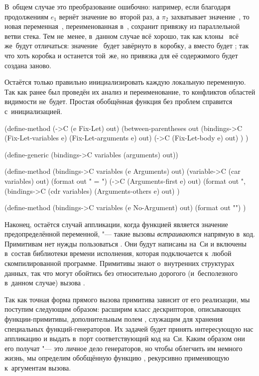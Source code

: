 В~общем случае это преобразование ошибочно: например, если благодаря
продолжениям $e_1$ вернёт значение во~второй раз, а $\pi_2$ захватывает
значение~, то новая переменная~, переименованная в~, сохранит
привязку  из параллельной ветви стека.
 Тем не~менее, в~данном случае
всё хорошо, так как клоны~ всё же~будут отличаться: значение~
будет завёрнуто в~коробку, а вместо  будет ; так что хоть
коробка и останется той~же, но привязка для её содержимого будет создана заново.

Остаётся только правильно инициализировать каждую локальную переменную. Так как
ранее был проведён их анализ и переименование, то конфликтов областей видимости
не~будет. Простая обобщённая функция  без проблем справится
с~инициализацией.

\begin{code:lisp}
(define-method (->C (e Fix-Let) out)
  (between-parentheses out
    (bindings->C (Fix-Let-variables e) (Fix-Let-arguments e) out)
    (->C (Fix-Let-body e) out) ) )

(define-generic (bindings->C variables (arguments) out))

(define-method (bindings->C variables (e Arguments) out)
  (variable->C (car variables) out)
  (format out " = ")
  (->C (Arguments-first e) out)
  (format out ",~%
  (bindings->C (cdr variables) (Arguments-others e) out) )

(define-method (bindings->C variables (e No-Argument) out)
  (format out "") )
\end{code:lisp}

Наконец, остаётся случай аппликации, когда функцией является значение
предопределённой переменной, "--- такие вызовы \emph{встраиваются} напрямую
в~код. Примитивам нет нужды пользоваться . Они будут написаны
на~Си и включены в~состав библиотеки времени исполнения, которая подключается
к~любой скомпилированной программе. Примитивы знают о~внутренних структурах
данных, так что могут обойтись без относительно дорогого (и~бесполезного
в~данном случае) вызова .

Так как точная форма прямого вызова примитива зависит от его реализации, мы
поступим следующим образом: расширим класс дескрипторов, описывающих
функции-примитивы, дополнительным полем , служащим для хранения
специальных функций-генераторов. Их задачей будет принять интересующую нас
аппликацию и выдать в~порт соответствующий код на~Си. Каким образом они его
получат "--- это личное дело генераторов, но чтобы облегчить им немного жизнь,
мы определим обобщённую функцию , рекурсивно применяющую
 к~аргументам вызова.


